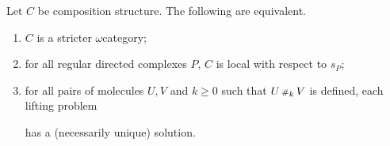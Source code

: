 \begin{lem} \label{lem:stricter_iff_local_wrt_pasting}
    Let \( C \) be composition structure.
    The following are equivalent.
    \begin{enumerate}
        \item \( C \) is a stricter \( \omega \)\nbd category;
        \item for all regular directed complexes \( P \), \( C \) is local with respect to \( s_P \);
        \item for all pairs of molecules \( U, V \) and \( k \geq 0 \) such that \( U \,{\scriptstyle\#}_{k}\, V \) is defined, each lifting problem
        \begin{center}
        \end{center}
        has a (necessarily unique) solution.
    \end{enumerate}
\end{lem}
